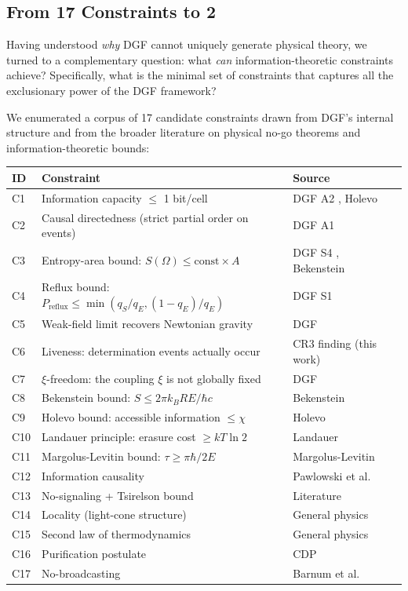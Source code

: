 \documentclass[12pt,a4paper]{article}
\theoremstyle{definition}
\theoremstyle{remark}
\begin{document}
\subsection{From 17 Constraints to 2}

Having understood \emph{why} DGF cannot uniquely generate physical theory, we turned to a complementary question: what \emph{can} information-theoretic constraints achieve? Specifically, what is the minimal set of constraints that captures all the exclusionary power of the DGF framework?

We enumerated a corpus of 17 candidate constraints drawn from DGF's internal structure and from the broader literature on physical no-go theorems and information-theoretic bounds:

\begin{center}
\begin{tabular}{lll}
\toprule
\textbf{ID} & \textbf{Constraint} & \textbf{Source} \\
\midrule
C1  & Information capacity $\leq$ 1 bit/cell & DGF A2 \cite{DGF2026}, Holevo~\cite{Holevo1973} \\
C2  & Causal directedness (strict partial order on events) & DGF A1 \cite{DGF2026} \\
C3  & Entropy-area bound: $S(\Omega) \leq \mathrm{const} \times A$ & DGF S4 \cite{DGF2026}, Bekenstein~\cite{Bekenstein1981} \\
C4  & Reflux bound: $P_{\mathrm{reflux}} \leq \min(q_S/q_E, (1-q_E)/q_E)$ & DGF S1 \cite{DGF2026} \\
C5  & Weak-field limit recovers Newtonian gravity & DGF \cite{DGF2026} \\
C6  & Liveness: determination events actually occur & CR3 finding (this work) \\
C7  & $\xi$-freedom: the coupling $\xi$ is not globally fixed & DGF \cite{DGF2026} \\
C8  & Bekenstein bound: $S \leq 2\pi k_B R E/\hbar c$ & Bekenstein~\cite{Bekenstein1981} \\
C9  & Holevo bound: accessible information $\leq \chi$ & Holevo~\cite{Holevo1973} \\
C10 & Landauer principle: erasure cost $\geq kT\ln 2$ & Landauer~\cite{Landauer1961} \\
C11 & Margolus-Levitin bound: $\tau \geq \pi\hbar/2E$ & Margolus-Levitin~\cite{ML1998} \\
C12 & Information causality~\cite{Pawlowski2009} & Pawlowski et al. \\
C13 & No-signaling + Tsirelson bound & Literature \\
C14 & Locality (light-cone structure) & General physics \\
C15 & Second law of thermodynamics & General physics \\
C16 & Purification postulate & CDP~\cite{CDP2011} \\
C17 & No-broadcasting & Barnum et al.~\cite{Barnum2007} \\
\bottomrule
\end{tabular}
\end{center}
\end{document}
